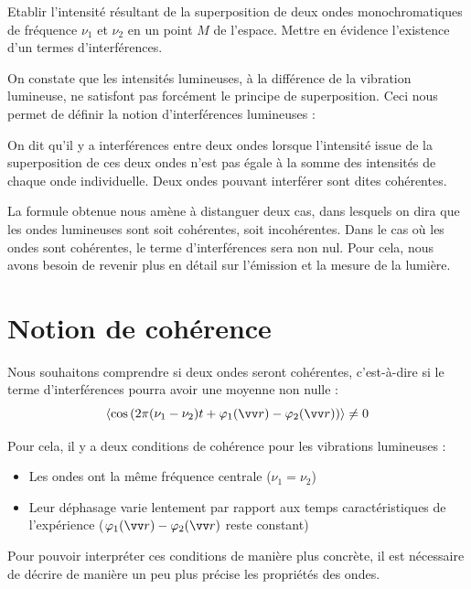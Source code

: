 \documentclass[11pt,fleqn]{book} %
\begin{document}
\begin{capex}
Etablir l'intensité résultant de la superposition de deux ondes monochromatiques de fréquence $\nu_1$ et $\nu_2$ en un point $M$ de l'espace. Mettre en évidence l'existence d'un termes d'interférences.
\end{capex}

On constate que les intensités lumineuses, à la différence de la vibration lumineuse, ne satisfont pas forcément le principe de superposition. Ceci nous permet de définir la notion d'interférences lumineuses :
\begin{definition}
	On dit qu’il y a interférences entre deux ondes lorsque l’intensité issue de la superposition de ces deux ondes n’est pas égale à la somme des intensités de chaque onde individuelle. Deux ondes pouvant interférer sont dites cohérentes.
\end{definition}

La formule obtenue nous amène à distanguer deux cas, dans lesquels on dira que les ondes lumineuses sont soit cohérentes, soit incohérentes. Dans le cas où les ondes sont cohérentes, le terme d'interférences sera non nul. Pour cela, nous avons besoin de revenir plus en détail sur l'émission et la mesure de la lumière.


\section{Notion de cohérence}

Nous souhaitons comprendre si deux ondes seront cohérentes, c'est-à-dire si le terme d'interférences pourra avoir une moyenne non nulle :
\begin{equation}
	\langle \cos \left( 2 \pi (\nu_1 - \nu_2) t + \varphi_1(\vv r) - \varphi_2(\vv r) \right) \rangle \neq 0
\end{equation}

Pour cela, il y a deux conditions de cohérence pour les vibrations lumineuses :
\begin{itemize}
	\item Les ondes ont la même fréquence centrale ($\nu_1 = \nu_2$)
	\item Leur déphasage varie lentement par rapport aux temps caractéristiques de l'expérience ($\varphi_1(\vv r) - \varphi_2(\vv r)$ reste constant)
\end{itemize}

Pour pouvoir interpréter ces conditions de manière plus concrète, il est nécessaire de décrire de manière un peu plus précise les propriétés des ondes.
\end{document}
